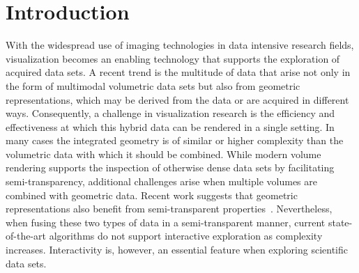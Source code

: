 \documentclass{egpubl}
\newcommand{\todo}[1]{{\color{red}\emph{(#1)}}}
\newcommand{\remark}[1]{{\color{blue!80!white}\textbf{Remark:} #1}}
\newcommand{\ab}{\mbox{A-buffer}}
\begin{document}
\section{Introduction}
\label{sec:introduction}


With the widespread use of imaging technologies in data intensive research fields, visualization becomes an enabling technology that supports the exploration of acquired data sets. 
A recent trend is the multitude of data that arise not only in the form of multimodal volumetric data sets but also from geometric representations, which may be derived from the data or are acquired in different ways.
Consequently, a challenge in visualization research is the efficiency and effectiveness at which this hybrid data can be rendered in a single setting. 
In many cases the integrated geometry is of similar or higher complexity than the volumetric data with which it should be combined. 
While modern volume rendering supports the inspection of otherwise dense data sets by facilitating semi-transparency, additional challenges arise when multiple volumes are combined with geometric data. 
Recent work suggests that geometric representations also benefit from semi-transparent properties~\cite{Guenther:2013:TOG}. 
Nevertheless, when fusing these two types of data in a semi-transparent manner, current state-of-the-art algorithms do not support interactive exploration as complexity increases.
Interactivity is, however, an essential feature when exploring scientific data sets.
\end{document}
